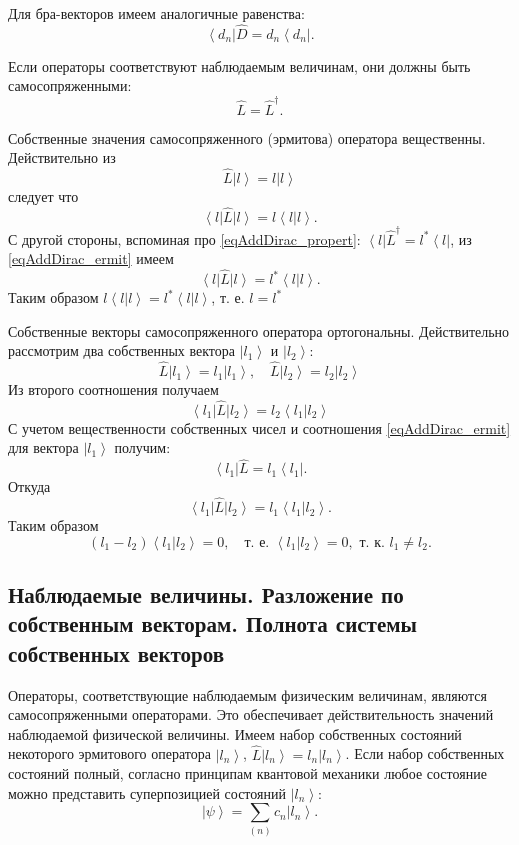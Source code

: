Для бра-векторов имеем аналогичные равенства:
\begin{equation}
\left<d_n\right| \hat{D}  = d_n \left<d_n\right|.
\end{equation}

Если операторы соответствуют наблюдаемым величинам, они должны быть самосопряженными:
\begin{equation}
\hat{L}  = \hat{L}^{\dag}.
\label{eqAddDirac_ermit}
\end{equation}

Собственные значения самосопряженного (эрмитова) оператора
вещественны. Действительно из 
\[
\hat{L} \left| l \right> = l \left| l \right>
\]
следует что 
\[
\left< l \right| \hat{L} \left| l \right> = l \left< l \right|
\left. l \right>.
\]
С другой стороны, вспоминая про \eqref{eqAddDirac_propert}:
$\left< l \right| \hat{L}^{\dag} = l^{*} \left< l \right|$, из
\eqref{eqAddDirac_ermit} имеем
\[
\left< l \right| \hat{L} \left| l \right> = l^{*} \left< l \right|
\left. l \right>.
\] 
Таким образом $l\left< l \right|
\left. l \right> = l^{*}\left< l \right|
\left. l \right>$, т. е. $l  = l^{*}$

Собственные векторы самосопряженного оператора ортогональны. 
Действительно рассмотрим два собственных вектора 
$\left| l_1 \right>$ и $\left| l_2 \right>$:
\[
\hat{L} \left| l_1 \right> = l_1 \left| l_1 \right>, \quad
\hat{L} \left| l_2 \right> = l_2 \left| l_2 \right>
\]
Из второго соотношения получаем
\[
\left< l_1 \right| \hat{L} \left| l_2 \right> = l_2 \left< l_1 \right| \left. l_2 \right>
\]
С учетом вещественности собственных чисел и соотношения
\eqref{eqAddDirac_ermit} для вектора $\left| l_1 \right>$ получим:
\[
\left< l_1 \right| \hat{L} = l_1 \left< l_1 \right|.
\]
Откуда
\[
\left< l_1 \right| \hat{L} \left| l_2 \right> = l_1 \left< l_1 \right| \left. l_2 \right>.
\] 
Таким образом
\[
\left(l_1 - l_2\right) \left< l_1 \right| \left. l_2 \right> = 0, 
\quad \mbox{т. е. } \left< l_1 \right| \left. l_2 \right> = 0,
\mbox{ т. к. } l_1 \neq l_2.
\] 

\subsection{Наблюдаемые  величины.  Разложение  по  собственным  векторам.  
Полнота  системы  собственных  векторов}
Операторы, соответствующие наблюдаемым физическим величинам, являются
самосопряженными операторами. Это обеспечивает действительность
значений наблюдаемой физической величины. Имеем набор собственных
состояний некоторого эрмитового  оператора  
$\left| l_n \right>$,  $\hat{L} \left| l_n \right> = l_n \left| l_n
\right>$.  Если набор собственных состояний полный, согласно принципам
квантовой механики любое состояние можно представить суперпозицией
состояний $\left| l_n \right>$:
\begin{equation}  
\left| \psi \right> = \sum_{(n)} c_n \left| l_n \right>.
\end{equation}  

